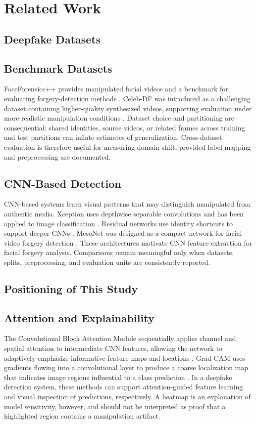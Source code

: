 \section{Related Work}

\subsection{Deepfake Datasets}
\subsection{Benchmark Datasets}
FaceForensics++ provides manipulated facial videos and a benchmark for evaluating forgery-detection methods \cite{rossler2019faceforensics}. Celeb-DF was introduced as a challenging dataset containing higher-quality synthesized videos, supporting evaluation under more realistic manipulation conditions \cite{li2020celebdf}. Dataset choice and partitioning are consequential: shared identities, source videos, or related frames across training and test partitions can inflate estimates of generalization. Cross-dataset evaluation is therefore useful for measuring domain shift, provided label mapping and preprocessing are documented.

\subsection{CNN-Based Detection}
CNN-based systems learn visual patterns that may distinguish manipulated from authentic media. Xception uses depthwise separable convolutions and has been applied to image classification \cite{chollet2017xception}. Residual networks use identity shortcuts to support deeper CNNs \cite{he2016deep}. MesoNet was designed as a compact network for facial video forgery detection \cite{afchar2018mesonet}. These architectures motivate CNN feature extraction for facial forgery analysis. Comparisons remain meaningful only when datasets, splits, preprocessing, and evaluation units are consistently reported.

\subsection{Positioning of This Study}
\subsection{Attention and Explainability}
The Convolutional Block Attention Module sequentially applies channel and spatial attention to intermediate CNN features, allowing the network to adaptively emphasize informative feature maps and locations \cite{woo2018cbam}. Grad-CAM uses gradients flowing into a convolutional layer to produce a coarse localization map that indicates image regions influential to a class prediction \cite{selvaraju2017gradcam}. In a deepfake detection system, these methods can support attention-guided feature learning and visual inspection of predictions, respectively. A heatmap is an explanation of model sensitivity, however, and should not be interpreted as proof that a highlighted region contains a manipulation artifact.

